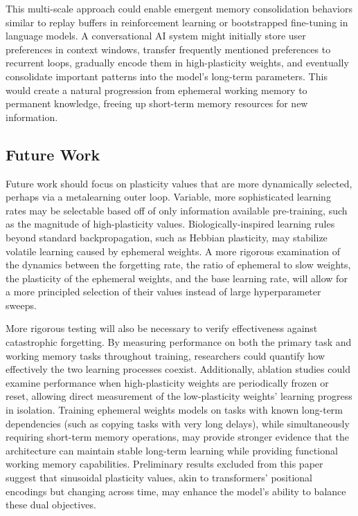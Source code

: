 This multi-scale approach could enable emergent memory consolidation behaviors similar to replay buffers in reinforcement learning or bootstrapped fine-tuning in language models. A conversational AI system might initially store user preferences in context windows, transfer frequently mentioned preferences to recurrent loops, gradually encode them in high-plasticity weights, and eventually consolidate important patterns into the model's long-term parameters. This would create a natural progression from ephemeral working memory to permanent knowledge, freeing up short-term memory resources for new information.

\subsection{Future Work} 

Future work should focus on plasticity values that are more dynamically selected, perhaps via a metalearning outer loop. Variable, more sophisticated learning rates may be selectable based off of only information available pre-training, such as the magnitude of high-plasticity values. Biologically-inspired learning rules beyond standard backpropagation, such as Hebbian plasticity, may stabilize volatile learning caused by ephemeral weights. A more rigorous examination of the dynamics between the forgetting rate, the ratio of ephemeral to slow weights, the plasticity of the ephemeral weights, and the base learning rate, will allow for a more principled selection of their values instead of large hyperparameter sweeps. 

More rigorous testing will also be necessary to verify effectiveness against catastrophic forgetting. By measuring performance on both the primary task and working memory tasks throughout training, researchers could quantify how effectively the two learning processes coexist. Additionally, ablation studies could examine performance when high-plasticity weights are periodically frozen or reset, allowing direct measurement of the low-plasticity weights' learning progress in isolation. Training ephemeral weights models on tasks with known long-term dependencies (such as copying tasks with very long delays), while simultaneously requiring short-term memory operations, may provide stronger evidence that the architecture can maintain stable long-term learning while providing functional working memory capabilities. Preliminary results excluded from this paper suggest that sinusoidal plasticity values, akin to transformers' positional encodings but changing across time, may enhance the model's ability to balance these dual objectives.

